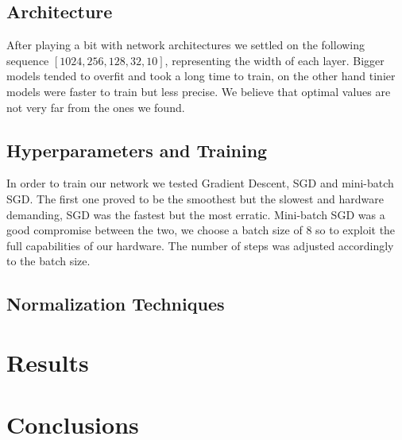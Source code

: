 \documentclass[10pt,a4paper]{report}
\begin{document}
\subsection{Architecture}
After playing a bit with network architectures we settled on the following sequence $[1024, 256, 128, 32, 10]$, representing the width of each layer. Bigger models tended to overfit and took a long time to train, on the other hand tinier models were faster to train but less precise. We believe that optimal values are not very far from the ones we found.
\subsection{Hyperparameters and Training}
In order to train our network we tested Gradient Descent, SGD and mini-batch SGD. The first one proved to be the smoothest but the slowest and hardware demanding, SGD was the fastest but the most erratic. Mini-batch SGD was a good compromise between the two, we choose a batch size of $8$ so to exploit the full capabilities of our hardware. The number of steps was adjusted accordingly to the batch size. 
\subsection{Normalization Techniques}
\section{Results}
\section{Conclusions}
\end{document}
